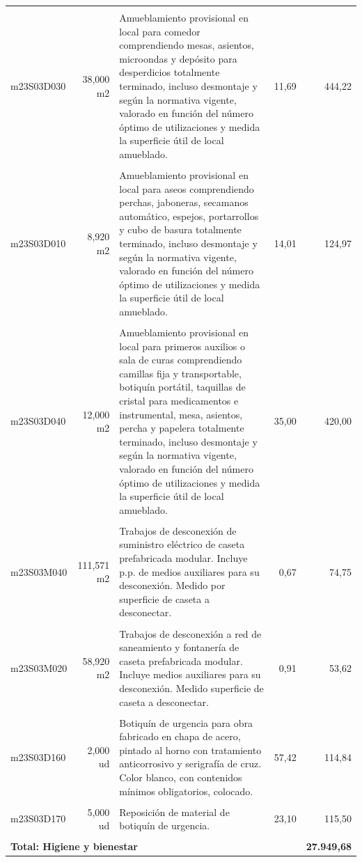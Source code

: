 \documentclass{book}%
\begin{document}
\begin{longtable}{lrlrr}
&&&&\\%
m23S03D030&    38,000 m2&\multicolumn{1}{p{5cm}}{Amueblamiento provisional en local para comedor comprendiendo mesas, asientos, microondas y depósito para desperdicios totalmente terminado, incluso desmontaje y según la normativa vigente, valorado en función del número óptimo de utilizaciones y medida la superficie útil de local amueblado.}&     11,69&444,22\\%
&&&&\\%
m23S03D010&     8,920 m2&\multicolumn{1}{p{5cm}}{Amueblamiento provisional en local para aseos comprendiendo perchas, jaboneras, secamanos automático, espejos, portarrollos y cubo de basura totalmente terminado, incluso desmontaje y según la normativa vigente, valorado en función del número óptimo de utilizaciones y medida la superficie útil de local amueblado.}&     14,01&124,97\\%
&&&&\\%
m23S03D040&    12,000 m2&\multicolumn{1}{p{5cm}}{Amueblamiento provisional en local para primeros auxilios o sala de curas comprendiendo camillas fija y transportable, botiquín portátil, taquillas de cristal para medicamentos e instrumental, mesa, asientos, percha y papelera totalmente terminado, incluso desmontaje y según la normativa vigente, valorado en función del número óptimo de utilizaciones y medida la superficie útil de local amueblado.}&     35,00&420,00\\%
&&&&\\%
m23S03M040&   111,571 m2&\multicolumn{1}{p{5cm}}{Trabajos de desconexión de suministro eléctrico de caseta prefabricada modular. Incluye p.p. de medios auxiliares para su desconexión. Medido por superficie de caseta a desconectar.}&      0,67&74,75\\%
&&&&\\%
m23S03M020&    58,920 m2&\multicolumn{1}{p{5cm}}{Trabajos de desconexión a red de saneamiento y fontanería de caseta prefabricada modular. Incluye medios auxiliares para su desconexión. Medido superficie de caseta a desconectar.}&      0,91&53,62\\%
&&&&\\%
m23S03D160&     2,000 ud&\multicolumn{1}{p{5cm}}{Botiquín de urgencia para obra fabricado en chapa de acero, pintado al horno con tratamiento anticorrosivo y serigrafía de cruz. Color blanco, con contenidos mínimos obligatorios, colocado.}&     57,42&114,84\\%
&&&&\\%
m23S03D170&     5,000 ud&\multicolumn{1}{p{5cm}}{Reposición de material de botiquín de urgencia.}&     23,10&115,50\\%
&&&&\\%
\multicolumn{4}{p{8cm}}{\textbf{Total: Higiene y bienestar}}&\textbf{27.949,68}\\%
\end{longtable}%
\normalsize
\end{document}
